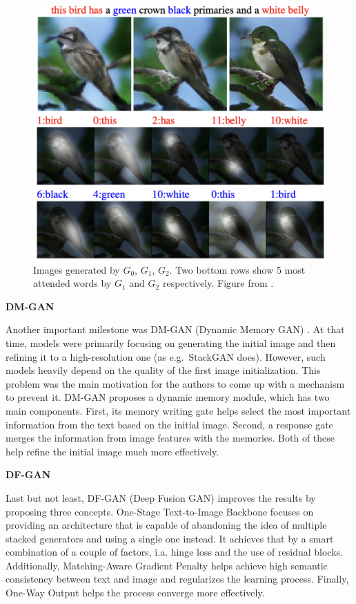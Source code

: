 \documentclass[
]{krantz}
\begin{document}
\begin{figure}

{\centering \includegraphics[width=0.8\linewidth]{figures/02-02-text-2-img/attngan} 

}

\caption{Images generated by \(G_{0}\), \(G_{1}\), \(G_{2}\). Two bottom rows show 5 most attended words by \(G_{1}\) and \(G_{2}\) respectively. Figure from \citet{AttnGAN2017}.}\label{fig:attngan}
\end{figure}



\textbf{DM-GAN}

Another important milestone was DM-GAN (Dynamic Memory GAN) \citep{DMGAN2019}. At that time, models were primarily focusing on generating the initial image and then refining it to a high-resolution one (as e.g.~StackGAN does). However, such models heavily depend on the quality of the first image initialization. This problem was the main motivation for the authors to come up with a mechanism to prevent it. DM-GAN proposes a dynamic memory module, which has two main components. First, its memory writing gate helps select the most important information from the text based on the initial image. Second, a response gate merges the information from image features with the memories. Both of these help refine the initial image much more effectively.

\textbf{DF-GAN}

Last but not least, DF-GAN (Deep Fusion GAN) \citep{DFGAN2020} improves the results by proposing three concepts. One-Stage Text-to-Image Backbone focuses on providing an architecture that is capable of abandoning the idea of multiple stacked generators and using a single one instead. It achieves that by a smart combination of a couple of factors, i.a. hinge loss and the use of residual blocks. Additionally, Matching-Aware Gradient Penalty helps achieve high semantic consistency between text and image and regularizes the learning process. Finally, One-Way Output helps the process converge more effectively.
\end{document}
